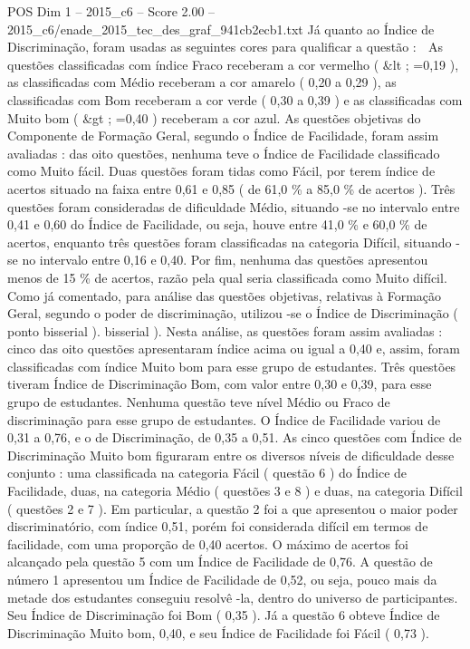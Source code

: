 \begin{textsample}{POS Dim 1 – 2015\_c6 – Score 2.00 – 2015\_c6/enade\_2015\_tec\_des\_graf\_941cb2ecb1.txt}
Já quanto ao Índice de Discriminação, foram usadas as seguintes cores para qualificar a questão :  As questões classificadas com índice Fraco receberam a cor vermelho ( \&lt ; =0,19 ), as classificadas com Médio receberam a cor amarelo ( 0,20 a 0,29 ), as classificadas com Bom receberam a cor verde ( 0,30 a 0,39 ) e as classificadas com Muito bom ( \&gt ; =0,40 ) receberam a cor azul.
As questões objetivas do Componente de Formação Geral, segundo o Índice de Facilidade, foram assim avaliadas : das oito questões, nenhuma teve o Índice de Facilidade classificado como Muito fácil.
Duas questões foram tidas como Fácil, por terem índice de acertos situado na faixa entre 0,61 e 0,85 ( de 61,0 \% a 85,0 \% de acertos ).
Três questões foram consideradas de dificuldade Médio, situando -se no intervalo entre 0,41 e 0,60 do Índice de Facilidade, ou seja, houve entre 41,0 \% e 60,0 \% de acertos, enquanto três questões foram classificadas na categoria Difícil, situando -se no intervalo entre 0,16 e 0,40.
Por fim, nenhuma das questões apresentou menos de 15 \% de acertos, razão pela qual seria classificada como Muito difícil.
Como já comentado, para análise das questões objetivas, relativas à Formação Geral, segundo o poder de discriminação, utilizou -se o Índice de Discriminação ( ponto bisserial ). bisserial ).
Nesta análise, as questões foram assim avaliadas : cinco das oito questões apresentaram índice acima ou igual a 0,40 e, assim, foram classificadas com índice Muito bom para esse grupo de estudantes.
Três questões tiveram Índice de Discriminação Bom, com valor entre 0,30 e 0,39, para esse grupo de estudantes.
Nenhuma questão teve nível Médio ou Fraco de discriminação para esse grupo de estudantes.
O Índice de Facilidade variou de 0,31 a 0,76, e o de Discriminação, de 0,35 a 0,51.
As cinco questões com Índice de Discriminação Muito bom figuraram entre os diversos níveis de dificuldade desse conjunto : uma classificada na categoria Fácil ( questão 6 ) do Índice de Facilidade, duas, na categoria Médio ( questões 3 e 8 ) e duas, na categoria Difícil ( questões 2 e 7 ).
Em particular, a questão 2 foi a que apresentou o maior poder discriminatório, com índice 0,51, porém foi considerada difícil em termos de facilidade, com uma proporção de 0,40 acertos.
O máximo de acertos foi alcançado pela questão 5 com um Índice de Facilidade de 0,76.
A questão de número 1 apresentou um Índice de Facilidade de 0,52, ou seja, pouco mais da metade dos estudantes conseguiu resolvê -la, dentro do universo de participantes.
Seu Índice de Discriminação foi Bom ( 0,35 ).
Já a questão 6 obteve Índice de Discriminação Muito bom, 0,40, e seu Índice de Facilidade foi Fácil ( 0,73 ).

\end{textsample}
